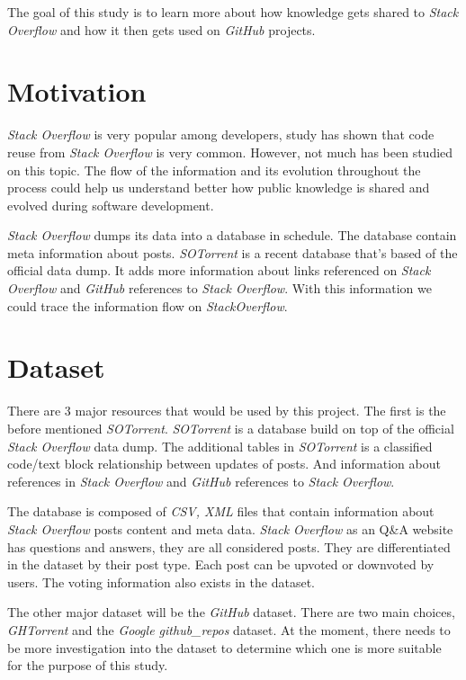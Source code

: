 \documentclass[sigconf]{acmart}
\begin{document}
The goal of this study is to learn more about how knowledge gets shared to {\it Stack Overflow} and how it then gets used on {\it GitHub} projects. 

\section{Motivation}

{\it Stack Overflow} is very popular among developers, study has shown that code reuse from {\it Stack Overflow} is very common. However, not much has been studied on this topic. The flow of the information and its evolution throughout the process could help us understand better how public knowledge is shared and evolved during software development.

{\it Stack Overflow} dumps its data into a database in schedule. The database contain meta information about posts. {\it SOTorrent} is a recent database that's based of the official data dump. It adds more information about links referenced on {\it Stack Overflow} and {\it GitHub} references to {\it Stack Overflow}. With this information we could trace the information flow on {\it StackOverflow}.

\section{Dataset}

There are 3 major resources that would be used by this project. The first is the before mentioned {\it SOTorrent}. {\it SOTorrent} is a database build on top of the official {\it Stack Overflow} data dump. The additional tables in {\it SOTorrent} is a classified code/text block relationship between updates of posts. And information about references in {\it Stack Overflow} and {\it GitHub} references to {\it Stack Overflow}.

The database is composed of {\it CSV, XML} files that contain information about {\it Stack Overflow} posts content and meta data. {\it Stack Overflow} as an Q\&A website has questions and answers, they are all considered posts. They are differentiated in the dataset by their post type. Each post can be upvoted or downvoted by users. The voting information also exists in the dataset. 

The other major dataset will be the {\it GitHub} dataset. There are two main choices, {\it GHTorrent} and the {\it Google github\_repos} dataset. At the moment, there needs to be more investigation into the dataset to determine which one is more suitable for the purpose of this study.
\end{document}
